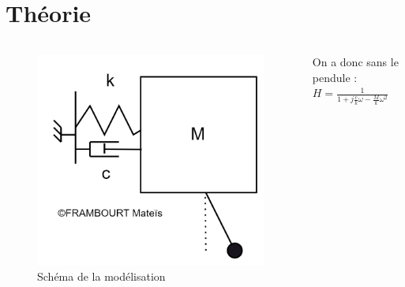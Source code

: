 \documentclass{beamer}
\begin{document}
	\section{Théorie}
	\begin{frame}
		\begin{columns}
			\begin{column}{0.5\textwidth}
				\begin{figure}
					\includegraphics[width=\textwidth]{Image/Schéma modélisation.png}
					\caption{Schéma de la modélisation}
				\end{figure}
			\end{column}
			\begin{column}{0.5\textwidth}
				On a donc sans le pendule : $H=\frac{1}{1+j\frac{c}{k}\omega-\frac{M}{k}\omega^2}$ 
				
			\end{column}
		\end{columns}
	\end{frame}
\end{document}
